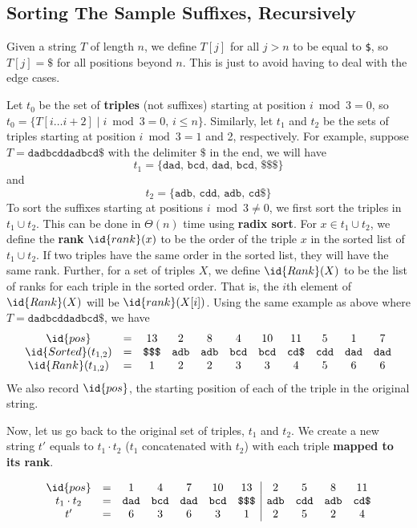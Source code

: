 \subsection{Sorting The Sample Suffixes, Recursively}

Given a string $T$ of length $n$, we define $T[j]$ for all $j > n$ to be equal to \texttt{\$}, so $T[j] = \texttt{\$}$ for all positions beyond $n$. This is just to avoid having to deal with the edge cases.

Let $t_0$ be the set of \textbf{triples} (not suffixes) starting at position $i \bmod 3 = 0$, so $t_0 = \{ T[i\ldots i+2] \mid i \bmod 3 = 0, \, i \leq n \}$. Similarly, let $t_1$ and $t_2$ be the sets of triples starting at position $i \bmod 3 = 1$ and 2, respectively. For example, suppose $T = \texttt{dadbcddadbcd\$}$ with the delimiter $\$$ in the end, we will have
$$
t_1 = \{\texttt{dad},\,\texttt{bcd},\,\texttt{dad},\,\texttt{bcd},\,\texttt{\$\$\$}\}
$$
and
$$
t_2 = \{ \texttt{adb},\, \texttt{cdd},\, \texttt{adb},\, \texttt{cd\$} \}
$$
To sort the suffixes starting at positions $i \bmod 3 \neq 0$, we first sort the triples in $t_1 \cup t_2$. This can be done in $\Theta(n)$ time using \textbf{radix sort}. For $x \in t_1 \cup t_2$, we define the \textbf{rank} $\id{rank}(x)$ to be the order of the triple $x$ in the sorted list of $t_1 \cup t_2$. If two triples have the same order in the sorted list, they will have the same rank. Further, for a set of triples $X$, we define $\id{Rank}(X)$ to be the list of ranks for each triple in the sorted order. That is, the $i$th element of $\id{Rank}(X)$ will be $\id{rank}(X[i])$. Using the same example as above where $T = \texttt{dadbcddadbcd\$}$, we have
$$
\begin{array}{ccccccccccc}
    \id{pos} & = & 13 & 2 & 8 & 4 & 10 & 11 & 5 & 1 & 7 \\
    \id{Sorted}(t_{1,2}) & = & \texttt{\$\$\$} & \texttt{adb} & \texttt{adb} & \texttt{bcd} & \texttt{bcd} & \texttt{cd\$} & \texttt{cdd} & \texttt{dad} & \texttt{dad} \\
    \id{Rank}(t_{1,2}) & = & 1 & 2 & 2 & 3 & 3 & 4 & 5 & 6 & 6
\end{array}
$$
We also record $\id{pos}$, the starting position of each of the triple in the original string.

Now, let us go back to the original set of triples, $t_1$ and $t_2$. We create a new string $t'$ equals to $t_1 \cdot t_2$ ($t_1$ concatenated with $t_2$) with each triple \textbf{mapped to its rank}.

$$
\begin{array}{ccccccc|cccc}
    \id{pos} & = & 1 & 4 & 7 & 10 & 13 &  2 & 5 & 8 & 11 \\
    t_1 \cdot t_2 & = & \texttt{dad} & \texttt{bcd} & \texttt{dad} & \texttt{bcd} & \texttt{\$\$\$} & \texttt{adb} & \texttt{cdd} & \texttt{adb} & \texttt{cd\$} \\
    t' & = & 6 & 3 & 6 & 3 & 1 & 2 & 5 & 2 & 4
\end{array}
$$


